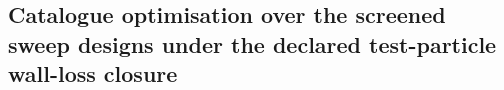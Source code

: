%
%
\subsection{Catalogue optimisation over the screened sweep designs under the declared test-particle wall-loss closure}
\label{sec:mdo-l0-v2}

